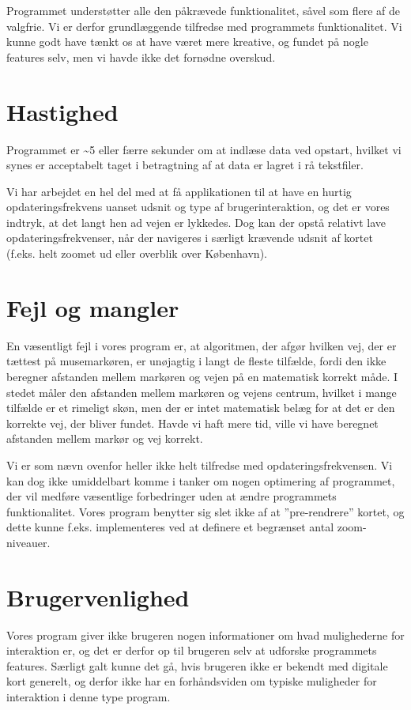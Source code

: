 Programmet understøtter alle den påkrævede funktionalitet, såvel som flere af de valgfrie. Vi er derfor grundlæggende tilfredse med programmets funktionalitet. Vi kunne godt have tænkt os at have været mere kreative, og fundet på nogle features selv, men vi havde ikke det fornødne overskud.

\section{Hastighed}

Programmet er \textasciitilde5 eller færre sekunder om at indlæse data ved opstart, hvilket vi synes er acceptabelt taget i betragtning af at data er lagret i rå tekstfiler.

Vi har arbejdet en hel del med at få applikationen til at have en hurtig opdateringsfrekvens uanset udsnit og type af brugerinteraktion, og det er vores indtryk, at det langt hen ad vejen er lykkedes. Dog kan der opstå relativt lave opdateringsfrekvenser, når der navigeres i særligt krævende udsnit af kortet (f.eks. helt zoomet ud eller overblik over København).

\section{Fejl og mangler}

En væsentligt fejl i vores program er, at algoritmen, der afgør hvilken vej, der er tættest på musemarkøren, er unøjagtig i langt de fleste tilfælde, fordi den ikke beregner afstanden mellem markøren og vejen på en matematisk korrekt måde. I stedet måler den afstanden mellem markøren og vejens centrum, hvilket i mange tilfælde er et rimeligt skøn, men der er intet matematisk belæg for at det er den korrekte vej, der bliver fundet. Havde vi haft mere tid, ville vi have beregnet afstanden mellem markør og vej korrekt.

Vi er som nævn ovenfor heller ikke helt tilfredse med opdateringsfrekvensen. Vi kan dog ikke umiddelbart komme i tanker om nogen optimering af programmet, der vil medføre væsentlige forbedringer uden at ændre programmets funktionalitet. Vores program benytter sig slet ikke af at ''pre-rendrere'' kortet, og dette kunne f.eks. implementeres ved at definere et begrænset antal zoom-niveauer.

\section{Brugervenlighed}

Vores program giver ikke brugeren nogen informationer om hvad mulighederne for interaktion er, og det er derfor op til brugeren selv at udforske programmets features. Særligt galt kunne det gå, hvis brugeren ikke er bekendt med digitale kort generelt, og derfor ikke har en forhåndsviden om typiske muligheder for interaktion i denne type program.